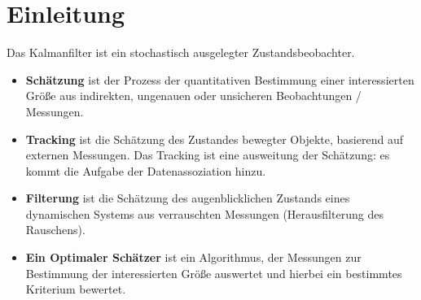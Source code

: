 \chapter{Einleitung}
Das Kalmanfilter ist ein stochastisch ausgelegter Zustandsbeobachter.

\begin{itemize}
    \item \textbf{Schätzung} ist der Prozess der quantitativen Bestimmung einer interessierten Größe aus indirekten,
        ungenauen oder unsicheren Beobachtungen / Messungen.
    \item \textbf{Tracking} ist die Schätzung des Zustandes bewegter Objekte, basierend auf externen Messungen.
        Das Tracking ist eine ausweitung der Schätzung: es kommt die Aufgabe der Datenassoziation hinzu.
    \item \textbf{Filterung} ist die Schätzung des augenblicklichen Zustands eines dynamischen Systems aus
        verrauschten Messungen (Herausfilterung des Rauschens).
    \item \textbf{Ein Optimaler Schätzer} ist ein Algorithmus, der Messungen zur Bestimmung der interessierten Größe
        auswertet und hierbei ein bestimmtes Kriterium bewertet.
\end{itemize}
